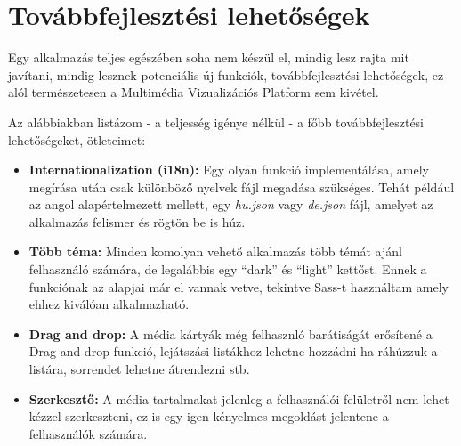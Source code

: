 \chapter{Továbbfejlesztési lehetőségek}
\label{appx:further_development}

Egy alkalmazás teljes egészében soha nem készül el, mindig lesz rajta mit javítani, mindig lesznek potenciális új funkciók, továbbfejlesztési lehetőségek, ez alól természetesen a Multimédia Vizualizációs Platform sem kivétel.

Az alábbiakban listázom - a teljesség igénye nélkül - a főbb továbbfejlesztési lehetőségeket, ötleteimet:
\begin{itemize}
    \item {\textbf {Internationalization (i18n): }} Egy olyan funkció implementálása, amely megírása után csak különböző nyelvek fájl megadása szükséges. Tehát például az angol alapértelmezett mellett, egy {\it hu.json} vagy {\it de.json} fájl, amelyet az alkalmazás felismer és rögtön be is húz.
	\item {\textbf {Több téma: }} Minden komolyan vehető alkalmazás több témát ajánl felhasználó számára, de legalábbis egy ``dark'' és ``light'' kettőst. Ennek a funkciónak az alapjai már el vannak vetve, tekintve Sass-t használtam amely ehhez kiválóan alkalmazható.
	\item {\textbf {Drag and drop: }} A média kártyák még felhasznló barátiságát erősítené a Drag and drop funkció, lejátszási listákhoz lehetne hozzádni ha ráhúzzuk a listára, sorrendet lehetne átrendezni stb.
	\item {\textbf {Szerkesztő: }} A média tartalmakat jelenleg a felhasználói felületről nem lehet kézzel szerkeszteni, ez is egy igen kényelmes megoldást jelentene a felhasználók számára.
\end{itemize}
